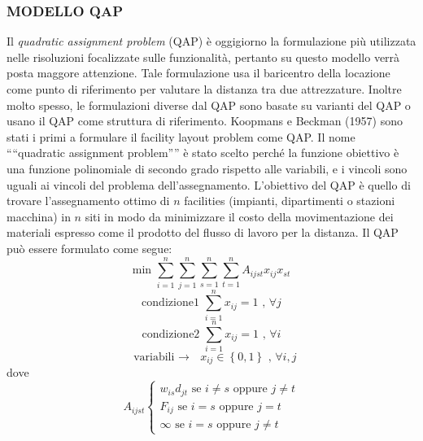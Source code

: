 \documentclass[12pt,a4paper,openright,twoside]{report}
\begin{document}
\subsubsection{MODELLO QAP}
Il \textit{quadratic assignment problem} (QAP) \`{e} oggigiorno la formulazione pi\`{u} utilizzata nelle risoluzioni focalizzate sulle funzionalit\`{a}, pertanto su questo modello verr\`{a} posta maggore attenzione. Tale formulazione usa il baricentro della locazione come punto di riferimento per valutare la distanza tra due attrezzature. Inoltre molto spesso, le formulazioni diverse dal QAP sono basate su varianti del QAP o usano il QAP come struttura di riferimento. Koopmans e Beckman (1957) sono stati i primi a formulare il facility layout problem come QAP. Il nome "`"`quadratic assignment problem"'"' \`{e} stato scelto perch\'{e} la funzione obiettivo \`{e} una funzione polinomiale di secondo grado rispetto alle variabili, e i vincoli sono uguali ai vincoli del problema dell'assegnamento. L'obiettivo del QAP \`{e} quello di trovare l'assegnamento ottimo di $n$ facilities (impianti, dipartimenti o stazioni macchina) in $n$ siti in modo da minimizzare il costo della movimentazione dei materiali espresso come il prodotto del flusso di lavoro per la distanza. Il QAP pu\`{o} essere formulato come segue:
\begin{equation} \label{eq19}
\mbox{min } \sum_{i=1}^{n}\sum_{j=1}^{n}\sum_{s=1}^{n}\sum_{t=1}^{n} A_{ijst}x_{ij}x_{st}
\end{equation}
\begin{equation} \label{eq20}
\mbox{condizione1 } \sum_{i=1}^{n}x_{ij} = 1 \mbox{ , } \forall j
\end{equation}
\begin{equation} \label{eq21}
\mbox{condizione2 } \sum_{i=1}^{n}x_{ij} = 1 \mbox{ , } \forall i
\end{equation}
\begin{equation} \label{eq22}
\mbox{ variabili $\rightarrow$ } x_{ij} \in \left\lbrace 0,1 \right\rbrace \mbox{ , } \forall i, j   
\end{equation}
dove
\begin{equation} \label{eq23}
A_{ijst}
\left\{
\begin{array}{ll}
w_{is} d_{jt} \mbox{ se } i \neq s \mbox{ oppure } j \neq t \\
F_{ij} \mbox{ se }i = s \mbox{ oppure } j = t \\
\infty \mbox{ se }i = s \mbox{ oppure } j \neq t
\end{array}
\right.
\end{equation}
\end{document}
